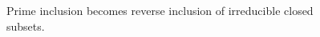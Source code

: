 \begin{figure}[ht]\centering
{}
\caption{Prime inclusion becomes reverse inclusion of irreducible closed subsets.}\label{fig:vi29-02}\end{figure}

